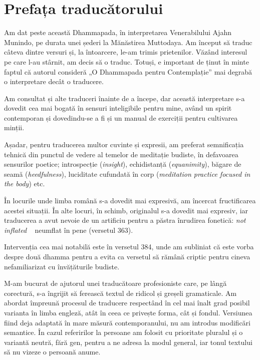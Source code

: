 
\chapter{Prefața traducătorului}

Am dat peste această Dhammapada, în interpretarea Venerabilului Ajahn Munindo, pe durata unei șederi la Mănăstirea Muttodaya. Am început să traduc câteva dintre versuri și, la întoarcere, le-am trimis prietenilor. Văzând interesul pe care l-au stârnit, am decis să o traduc. Totuși, e important de ținut în minte faptul că autorul consideră „O Dhammapada pentru Contemplație” mai degrabă o interpretare decât o traducere.

Am consultat și alte traduceri înainte de a începe, dar această interpretare s-a dovedit cea mai bogată în sensuri inteligibile pentru mine, având un spirit contemporan și dovedindu-se a fi și un manual de exerciții pentru cultivarea minții.

Așadar, pentru traducerea multor cuvinte și expresii, am preferat semnificația tehnică din punctul de vedere al temelor de meditație budiste, în defavoarea sensurilor poetice; introspecție (\emph{insight}), echidistanță (\emph{equanimity}), băgare de seamă (\emph{heedfulness}), luciditate cufundată în corp (\emph{meditation practice focused in the body}) etc.

În locurile unde limba română s-a dovedit mai expresivă, am încercat fructificarea acestei situații. În alte locuri, în schimb, originalul s-a dovedit mai expresiv, iar traducerea a avut nevoie de un artificiu pentru a păstra înrudirea fonetică: \emph{not inflated} ~ neumflat în pene (versetul 363).

Intervenția cea mai notabilă este în versetul 384, unde am subliniat că este vorba despre două dhamma pentru a evita ca versetul să rămână criptic pentru cineva nefamiliarizat cu învățăturile budiste.

M-am bucurat de ajutorul unei traducătoare profesioniste care, pe lângă corectură, s-a îngrijit să ferească textul de ridicol și greșeli gramaticale. Am abordat împreună procesul de traducere respectând în cel mai înalt grad posibil varianta în limba engleză, atât în ceea ce privește forma, cât și fondul. Versiunea fiind deja adaptată în mare măsură contemporanului, nu am introdus modificări semantice. În cazul referirilor la persoane am folosit cu prioritate pluralul și o variantă neutră, fără gen, pentru a ne adresa la modul general, iar tonul textului să nu vizeze o persoană anume.

